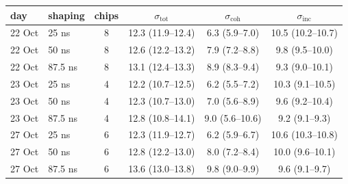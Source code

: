 \begin{tabular}{llcccc}
\toprule
day & shaping & chips & $\sigma_\mathrm{tot}$ & $\sigma_\mathrm{coh}$ & $\sigma_\mathrm{inc}$ \\
\midrule
22 Oct & 25 ns & 8 & 12.3 (11.9--12.4) & 6.3 (5.9--7.0) & 10.5 (10.2--10.7) \\
22 Oct & 50 ns & 8 & 12.6 (12.2--13.2) & 7.9 (7.2--8.8) & 9.8 (9.5--10.0) \\
22 Oct & 87.5 ns & 8 & 13.1 (12.4--13.3) & 8.9 (8.3--9.4) & 9.3 (9.0--10.1) \\
\midrule
23 Oct & 25 ns & 4 & 12.2 (10.7--12.5) & 6.2 (5.5--7.2) & 10.3 (9.1--10.5) \\
23 Oct & 50 ns & 4 & 12.3 (10.7--13.0) & 7.0 (5.6--8.9) & 9.6 (9.2--10.4) \\
23 Oct & 87.5 ns & 4 & 12.8 (10.8--14.1) & 9.0 (5.6--10.6) & 9.2 (9.1--9.3) \\
\midrule
27 Oct & 25 ns & 6 & 12.3 (11.9--12.7) & 6.2 (5.9--6.7) & 10.6 (10.3--10.8) \\
27 Oct & 50 ns & 6 & 12.8 (12.2--13.0) & 8.0 (7.2--8.4) & 10.0 (9.6--10.1) \\
27 Oct & 87.5 ns & 6 & 13.6 (13.0--13.8) & 9.8 (9.0--9.9) & 9.6 (9.1--9.7) \\
\bottomrule
\end{tabular}
